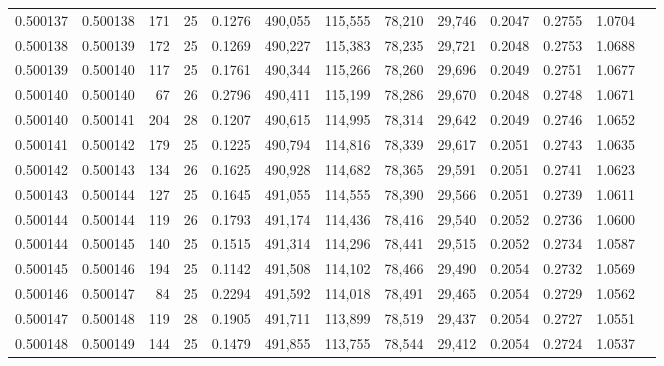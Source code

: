 \begin{tabular}{rrrrrrrrrrrrr}
0.500137 & 0.500138 & 171 &  25 &                                     0.1276 & 490,055 & 115,555 &  78,210 &  29,746 & 0.2047 & 0.2755 & 1.0704 \\
0.500138 & 0.500139 & 172 &  25 &                                     0.1269 & 490,227 & 115,383 &  78,235 &  29,721 & 0.2048 & 0.2753 & 1.0688 \\
0.500139 & 0.500140 & 117 &  25 &                                     0.1761 & 490,344 & 115,266 &  78,260 &  29,696 & 0.2049 & 0.2751 & 1.0677 \\
0.500140 & 0.500140 &  67 &  26 &                                     0.2796 & 490,411 & 115,199 &  78,286 &  29,670 & 0.2048 & 0.2748 & 1.0671 \\
0.500140 & 0.500141 & 204 &  28 &                                     0.1207 & 490,615 & 114,995 &  78,314 &  29,642 & 0.2049 & 0.2746 & 1.0652 \\
0.500141 & 0.500142 & 179 &  25 &                                     0.1225 & 490,794 & 114,816 &  78,339 &  29,617 & 0.2051 & 0.2743 & 1.0635 \\
0.500142 & 0.500143 & 134 &  26 &                                     0.1625 & 490,928 & 114,682 &  78,365 &  29,591 & 0.2051 & 0.2741 & 1.0623 \\
0.500143 & 0.500144 & 127 &  25 &                                     0.1645 & 491,055 & 114,555 &  78,390 &  29,566 & 0.2051 & 0.2739 & 1.0611 \\
0.500144 & 0.500144 & 119 &  26 &                                     0.1793 & 491,174 & 114,436 &  78,416 &  29,540 & 0.2052 & 0.2736 & 1.0600 \\
0.500144 & 0.500145 & 140 &  25 &                                     0.1515 & 491,314 & 114,296 &  78,441 &  29,515 & 0.2052 & 0.2734 & 1.0587 \\
0.500145 & 0.500146 & 194 &  25 &                                     0.1142 & 491,508 & 114,102 &  78,466 &  29,490 & 0.2054 & 0.2732 & 1.0569 \\
0.500146 & 0.500147 &  84 &  25 &                                     0.2294 & 491,592 & 114,018 &  78,491 &  29,465 & 0.2054 & 0.2729 & 1.0562 \\
0.500147 & 0.500148 & 119 &  28 &                                     0.1905 & 491,711 & 113,899 &  78,519 &  29,437 & 0.2054 & 0.2727 & 1.0551 \\
0.500148 & 0.500149 & 144 &  25 &                                     0.1479 & 491,855 & 113,755 &  78,544 &  29,412 & 0.2054 & 0.2724 & 1.0537 \\

\end{tabular}
